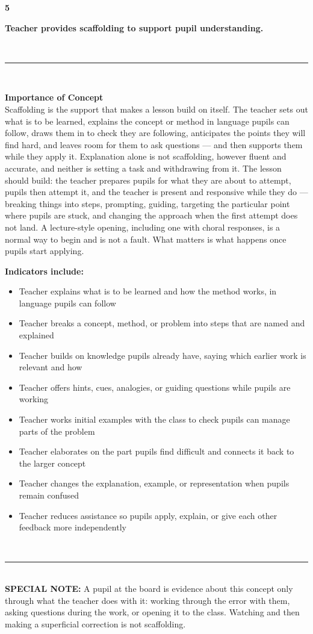 \documentclass[10pt,a4paper]{article}
\newcommand{\conceptheader}[2]{%
  \noindent
  \begin{minipage}[c]{13mm}\raggedright
    {\fontsize{30}{30}\selectfont\bfseries\color{tnavy}#1}
  \end{minipage}%
  \begin{minipage}[c]{\dimexpr\linewidth-13mm\relax}\RaggedRight
    {\large\bfseries #2}
  \end{minipage}\\[1.5mm]
  \textcolor{tnavy}{\rule{\linewidth}{1.1pt}}\\[2mm]}
\newcommand{\twopane}[2]{%
  \noindent
  \begin{minipage}[t]{0.475\linewidth}\RaggedRight
    {\bfseries\small Importance of Concept}\\[1.4mm]
    \footnotesize #1 \normalsize
  \end{minipage}\hfill
  \begin{minipage}[t]{0.475\linewidth}\RaggedRight
    {\bfseries\small Indicators include:}\\[0.6mm]
    #2
  \end{minipage}\\[2mm]}
\newcommand{\specialnote}[1]{%
  \noindent\textcolor{trule}{\rule{\linewidth}{0.4pt}}\\[1.2mm]
  {\footnotesize\textbf{SPECIAL NOTE:} #1}\\[2mm]}
\begin{document}
\clearpage


\conceptheader{5}{Teacher provides scaffolding to support pupil understanding.}
 
\twopane{%
Scaffolding is the support that makes a lesson build on itself. The teacher sets out what is to be learned,
explains the concept or method in language pupils can follow, draws them in to check they are following,
anticipates the points they will find hard, and leaves room for them to ask questions --- and then supports
them while they apply it. Explanation alone is not scaffolding, however fluent and accurate, and neither is
setting a task and withdrawing from it. The lesson should build: the teacher prepares pupils for what they
are about to attempt, pupils then attempt it, and the teacher is present and responsive while they do ---
breaking things into steps, prompting, guiding, targeting the particular point where pupils are stuck, and
changing the approach when the first attempt does not land. A lecture-style opening, including one with
choral responses, is a normal way to begin and is not a fault. What matters is what happens once pupils
start applying.%
}{%
\footnotesize
\begin{itemize}
  \item Teacher explains what is to be learned and how the method works, in language pupils can follow
  \item Teacher breaks a concept, method, or problem into steps that are named and explained
  \item Teacher builds on knowledge pupils already have, saying which earlier work is relevant and how
  \item Teacher offers hints, cues, analogies, or guiding questions while pupils are working
  \item Teacher works initial examples with the class to check pupils can manage parts of the problem
  \item Teacher elaborates on the part pupils find difficult and connects it back to the larger concept
  \item Teacher changes the explanation, example, or representation when pupils remain confused
  \item Teacher reduces assistance so pupils apply, explain, or give each other feedback more independently
\end{itemize}
\normalsize
}
 
\specialnote{A pupil at the board is evidence about this concept only through what the teacher does with it:
working through the error with them, asking questions during the work, or opening it to the class. Watching
and then making a superficial correction is not scaffolding.}
 
\end{document}

